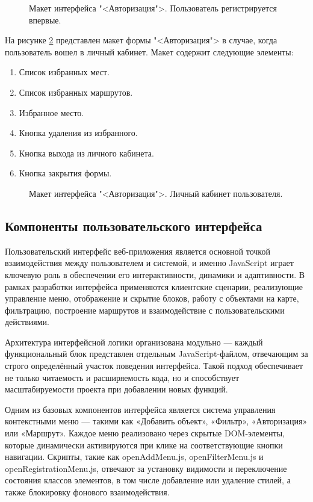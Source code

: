 \vspace{+40mm}
\begin{figure}[ht]
	\center{\texttt{[image: gr8]}}
	\caption{Макет интерфейса "<Авторизация">. Пользователь регистрируется впервые.}
	\label{gr8:image}
\end{figure}

На рисунке \ref{gr9:image} представлен макет формы "<Авторизация"> в случае, когда пользователь вошел в личный кабинет. Макет содержит следующие элементы:

\begin{enumerate}
	\item Список избранных мест.
	\item Список избранных маршрутов.
	\item Избранное место.
	\item Кнопка удаления из избранного.
	\item Кнопка выхода из личного кабинета.
	\item Кнопка закрытия формы.
\end{enumerate}

\begin{figure}[ht]
	\center{\texttt{[image: gr9]}}
	\caption{Макет интерфейса "<Авторизация">. Личный кабинет пользователя.}
	\label{gr9:image}
\end{figure}

\subsection{Компоненты пользовательского интерфейса}

Пользовательский интерфейс веб-приложения является основной точкой взаимодействия между пользователем и системой, и именно JavaScript играет ключевую роль в обеспечении его интерактивности, динамики и адаптивности. В рамках разработки интерфейса применяются клиентские сценарии, реализующие управление меню, отображение и скрытие блоков, работу с объектами на карте, фильтрацию, построение маршрутов и взаимодействие с пользовательскими действиями.

Архитектура интерфейсной логики организована модульно — каждый функциональный блок представлен отдельным JavaScript-файлом, отвечающим за строго определённый участок поведения интерфейса. Такой подход обеспечивает не только читаемость и расширяемость кода, но и способствует масштабируемости проекта при добавлении новых функций.

Одним из базовых компонентов интерфейса является система управления контекстными меню — такими как «Добавить объект», «Фильтр», «Авторизация» или «Маршрут». Каждое меню реализовано через скрытые DOM-элементы, которые динамически активируются при клике на соответствующие кнопки навигации. Скрипты, такие как openAddMenu.js, openFilterMenu.js и openRegistrationMenu.js, отвечают за установку видимости и переключение состояния классов элементов, в том числе добавление или удаление стилей, а также блокировку фонового взаимодействия.

